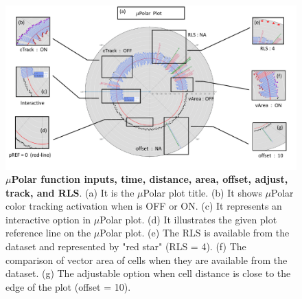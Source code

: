 \documentclass[conference]{IEEEtran}
\begin{document}
\begin{figure}
\centering
\includegraphics[width=\textwidth,height=10 cm]{Patterns/function_argu.pdf}
\caption{ \textbf{ $\mu$Polar function inputs, time, distance, area, offset, adjust, track, and RLS}. (a) It is the $\mu$Polar plot title. (b) It shows $\mu$Polar color tracking activation when is OFF or ON. (c) It represents an interactive option in $\mu$Polar plot. (d) It illustrates the given plot reference line on the $\mu$Polar plot. (e) The RLS is available from the dataset and represented by "red star" (RLS = 4). (f) The comparison of vector area of cells when they are available from the dataset. (g) The adjustable option when cell distance is close to the edge of the plot (offset = 10).}
\label{fig:label}
\end{figure}
\end{document}
